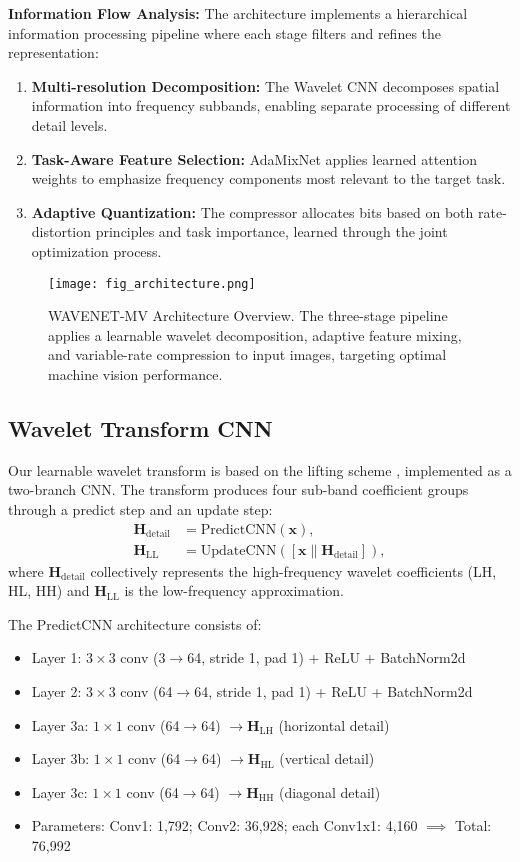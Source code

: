 \documentclass[conference]{IEEEtran}
\begin{document}
\textbf{Information Flow Analysis:} The architecture implements a hierarchical information processing pipeline where each stage filters and refines the representation:
\begin{enumerate}
\item \textbf{Multi-resolution Decomposition:} The Wavelet CNN decomposes spatial information into frequency subbands, enabling separate processing of different detail levels.
\item \textbf{Task-Aware Feature Selection:} AdaMixNet applies learned attention weights to emphasize frequency components most relevant to the target task.
\item \textbf{Adaptive Quantization:} The compressor allocates bits based on both rate-distortion principles and task importance, learned through the joint optimization process.
\end{enumerate}

\begin{figure}[htbp]
\centering
\texttt{[image: fig\_architecture.png]}
\caption{WAVENET-MV Architecture Overview. The three-stage pipeline applies a learnable wavelet decomposition, adaptive feature mixing, and variable-rate compression to input images, targeting optimal machine vision performance.}
\label{fig:architecture}
\end{figure}

\subsection{Wavelet Transform CNN}

Our learnable wavelet transform is based on the lifting scheme \cite{daubechies1998factoring}, implemented as a two-branch CNN. The transform produces four sub-band coefficient groups through a predict step and an update step:
\begin{align}
\mathbf{H}_{\text{detail}} &= \text{PredictCNN}(\mathbf{x}), \\
\mathbf{H}_{\text{LL}} &= \text{UpdateCNN}([\mathbf{x} \| \mathbf{H}_{\text{detail}}]),
\end{align}
where $\mathbf{H}_{\text{detail}}$ collectively represents the high-frequency wavelet coefficients (LH, HL, HH) and $\mathbf{H}_{\text{LL}}$ is the low-frequency approximation.

The PredictCNN architecture consists of:
\begin{itemize}
\item Layer 1: $3\times 3$ conv (3$\to$64, stride 1, pad 1) + ReLU + BatchNorm2d
\item Layer 2: $3\times 3$ conv (64$\to$64, stride 1, pad 1) + ReLU + BatchNorm2d
\item Layer 3a: $1\times 1$ conv (64$\to$64) $\to \mathbf{H}_{\text{LH}}$ (horizontal detail)
\item Layer 3b: $1\times 1$ conv (64$\to$64) $\to \mathbf{H}_{\text{HL}}$ (vertical detail)
\item Layer 3c: $1\times 1$ conv (64$\to$64) $\to \mathbf{H}_{\text{HH}}$ (diagonal detail)
\item Parameters: Conv1: 1,792; Conv2: 36,928; each Conv1x1: 4,160 $\implies$ Total: 76,992
\end{itemize}
\end{document}
